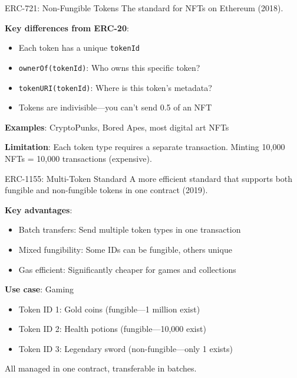 \documentclass[10pt]{beamer}
\begin{document}
\begin{frame}{ERC-721: Non-Fungible Tokens}
  The standard for NFTs on Ethereum (2018).
  
  \vspace{0.5em}
  \textbf{Key differences from ERC-20}:
  \begin{itemize}
    \item Each token has a unique \texttt{tokenId}
    \item \texttt{ownerOf(tokenId)}: Who owns this specific token?
    \item \texttt{tokenURI(tokenId)}: Where is this token's metadata?
    \item Tokens are indivisible---you can't send 0.5 of an NFT
  \end{itemize}
  
  \vspace{1em}
  \textbf{Examples}: CryptoPunks, Bored Apes, most digital art NFTs
  
  \vspace{1em}
  \textbf{Limitation}: Each token type requires a separate transaction. Minting 10,000 NFTs = 10,000 transactions (expensive).
\end{frame}

\begin{frame}{ERC-1155: Multi-Token Standard}
  A more efficient standard that supports both fungible and non-fungible tokens in one contract (2019).
  
  \vspace{0.5em}
  \textbf{Key advantages}:
  \begin{itemize}
    \item Batch transfers: Send multiple token types in one transaction
    \item Mixed fungibility: Some IDs can be fungible, others unique
    \item Gas efficient: Significantly cheaper for games and collections
  \end{itemize}
  
  \vspace{1em}
  \textbf{Use case}: Gaming
  \begin{itemize}
    \item Token ID 1: Gold coins (fungible---1 million exist)
    \item Token ID 2: Health potions (fungible---10,000 exist)
    \item Token ID 3: Legendary sword (non-fungible---only 1 exists)
  \end{itemize}
  
  \vspace{0.5em}
  All managed in one contract, transferable in batches.
\end{frame}
\end{document}
